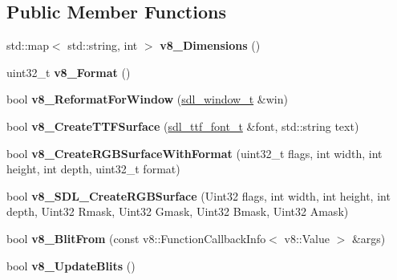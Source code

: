\subsection*{Public Member Functions}
\begin{DoxyCompactItemize}
\item 
\mbox{\label{classSdlSurface_a992eb6f172a48354ce55eddc63002de1}} 
std\+::map$<$ std\+::string, int $>$ {\bfseries v8\+\_\+\+Dimensions} ()
\item 
\mbox{\label{classSdlSurface_aad36e268e443efd283341091435bf9cd}} 
uint32\+\_\+t {\bfseries v8\+\_\+\+Format} ()
\item 
\mbox{\label{classSdlSurface_ade41c720d309563afa2bcd3fd69d77a5}} 
bool {\bfseries v8\+\_\+\+Reformat\+For\+Window} (\mbox{\hyperlink{classWrapPtr}{sdl\+\_\+window\+\_\+t}} \&win)
\item 
\mbox{\label{classSdlSurface_ad9d88a48c433bf0fbf747bc075491cc2}} 
bool {\bfseries v8\+\_\+\+Create\+T\+T\+F\+Surface} (\mbox{\hyperlink{classWrapPtr}{sdl\+\_\+ttf\+\_\+font\+\_\+t}} \&font, std\+::string text)
\item 
\mbox{\label{classSdlSurface_a065eaba22f9f2efc27529758804f78da}} 
bool {\bfseries v8\+\_\+\+Create\+R\+G\+B\+Surface\+With\+Format} (uint32\+\_\+t flags, int width, int height, int depth, uint32\+\_\+t format)
\item 
\mbox{\label{classSdlSurface_a2131905cceac3259ade93234dc87ec31}} 
bool {\bfseries v8\+\_\+\+S\+D\+L\+\_\+\+Create\+R\+G\+B\+Surface} (Uint32 flags, int width, int height, int depth, Uint32 Rmask, Uint32 Gmask, Uint32 Bmask, Uint32 Amask)
\item 
\mbox{\label{classSdlSurface_a9d22fd86a01bc9abf3e06b5f398b710d}} 
bool {\bfseries v8\+\_\+\+Blit\+From} (const v8\+::\+Function\+Callback\+Info$<$ v8\+::\+Value $>$ \&args)
\item 
\mbox{\label{classSdlSurface_ae142f0e6f3ae5e1ac7530b217cdad2e1}} 
bool {\bfseries v8\+\_\+\+Update\+Blits} ()
\item 
\mbox{\label{classSdlSurface_a6ccc7904a415fc84203d4622f6892cdb}} 

\end{DoxyCompactItemize}
